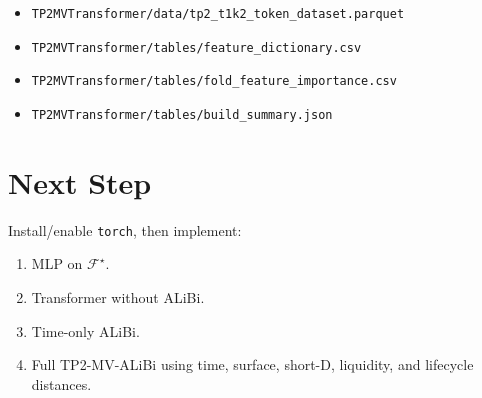\documentclass[11pt]{article}
\begin{document}
\begin{itemize}
  \item \texttt{TP2MVTransformer/data/tp2\_t1k2\_token\_dataset.parquet}
  \item \texttt{TP2MVTransformer/tables/feature\_dictionary.csv}
  \item \texttt{TP2MVTransformer/tables/fold\_feature\_importance.csv}
  \item \texttt{TP2MVTransformer/tables/build\_summary.json}
\end{itemize}

\section*{Next Step}

Install/enable \texttt{torch}, then implement:

\begin{enumerate}
  \item MLP on \( \mathcal F^\star \).
  \item Transformer without ALiBi.
  \item Time-only ALiBi.
  \item Full TP2-MV-ALiBi using time, surface, short-D, liquidity, and lifecycle distances.
\end{enumerate}
\end{document}
